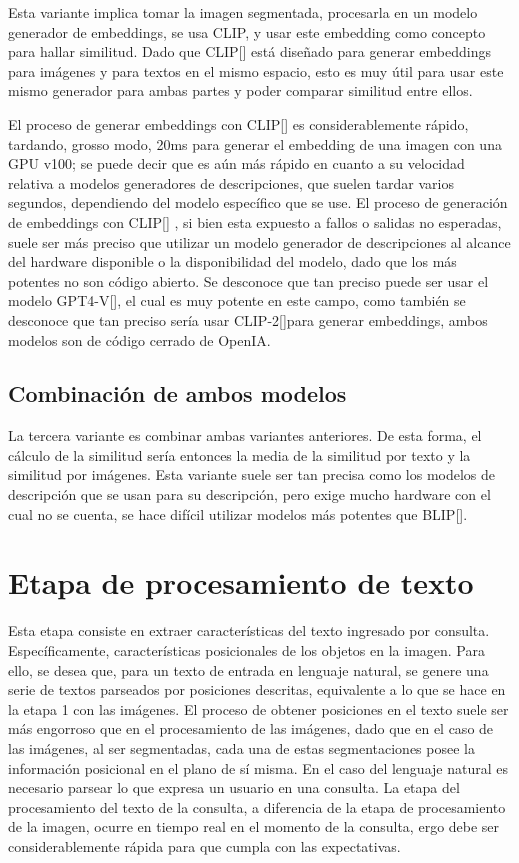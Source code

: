 Esta variante implica tomar la imagen segmentada, procesarla en un modelo generador de embeddings, se usa CLIP, y usar este embedding como concepto para hallar similitud. Dado que CLIP[\cite{clip}] está diseñado para generar embeddings para imágenes y para textos en el mismo espacio, esto es muy útil para usar este mismo generador para ambas partes y poder comparar similitud entre ellos.

El proceso de generar embeddings con CLIP[\cite{clip}] es considerablemente rápido, tardando, grosso modo, 20ms para generar el embedding de una imagen con una GPU v100; se puede decir que es aún más rápido en cuanto a su velocidad relativa a modelos generadores de descripciones, que suelen tardar varios segundos, dependiendo del modelo específico que se use. El proceso de generación de embeddings con CLIP[\cite{clip}] , si bien esta expuesto a fallos o salidas no esperadas, suele ser más preciso que utilizar un modelo generador de descripciones al alcance del hardware disponible o la disponibilidad del modelo, dado que los más potentes no son código abierto. Se desconoce que tan preciso puede ser usar el modelo GPT4-V[\cite{gpt-4v}], el cual es muy potente en este campo, como también se desconoce que tan preciso sería usar CLIP-2[\cite{clip2-paper}]para generar embeddings, ambos modelos son de código cerrado de OpenIA.

\subsection{Combinaci\'on de ambos modelos}
La tercera variante es combinar ambas variantes anteriores. De esta forma, el cálculo de la similitud sería entonces la media de la similitud por texto y la similitud por imágenes. Esta variante suele ser tan precisa como los modelos de descripción que se usan para su descripción, pero exige mucho hardware con el cual no se cuenta, se hace dif\'icil utilizar modelos más potentes que BLIP[\cite{blip}].

\section{Etapa de procesamiento de texto}

Esta etapa consiste en extraer características del texto ingresado por consulta. Específicamente, características posicionales de los objetos en la imagen. Para ello, se desea que, para un texto de entrada en lenguaje natural, se genere una serie de textos parseados por posiciones descritas, equivalente a lo que se hace en la etapa 1 con las imágenes. El proceso de obtener posiciones en el texto suele ser más engorroso que en el procesamiento de las imágenes, dado que en el caso de las imágenes, al ser segmentadas, cada una de estas segmentaciones posee la información posicional en el plano de sí misma. En el caso del lenguaje natural es necesario parsear lo que expresa un usuario en una consulta. La etapa del procesamiento del texto de la consulta, a diferencia de la etapa de procesamiento de la imagen, ocurre en tiempo real en el momento de la consulta, ergo debe ser considerablemente rápida para que cumpla con las expectativas.

